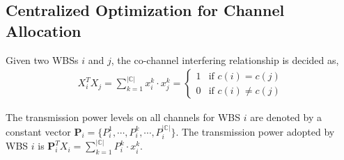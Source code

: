 \documentclass[times]{ettauth}
\theoremstyle{mytheoremstyle}
\theoremstyle{mytheoremstyle}
\theoremstyle{mytheoremstyle}
\renewcommand{\vec}[1]{\mathbf{#1}}
\begin{document}


\subsection{Centralized Optimization for Channel Allocation}
\label{03_centralized_ca}

Given two WBSs $i$ and $j$, the co-channel interfering relationship is decided as,
\begin{equation}
\begin{split}
X_i^TX_j = \sum\limits_{k=1}^{|\mathbb{C}|}x_i^k\cdot x_j^k = 
\left\{ \begin{array}{ll}
1 & \mbox{if $c(i)=c(j)$} \\
0 & \mbox{if $c(i)\neq c(j)$} 
\end{array}
\right.
\end{split}
\end{equation}

The transmission power levels on all channels for WBS $i$ are denoted by a constant vector $\vec{P}_i = \{P_i^1,\cdots, P_i^k,\cdots, P_i^{|\mathbb{C}|}\}$. 
The transmission power adopted by WBS $i$ is $\vec{P}_i^TX_i = \sum\limits_{k=1}^{|\mathbb{C}|}P_{i}^k\cdot x_i^k$.
\end{document}
